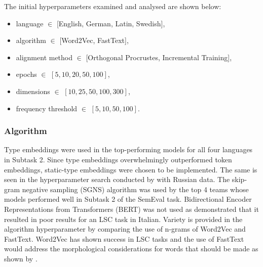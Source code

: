 The initial hyperparameters examined and analysed are shown below:
\begin{itemize}
    \item language $\in$ [English, German, Latin, Swedish],
    \item algorithm $\in$ [Word2Vec, FastText],
    \item alignment method $\in$ [Orthogonal Procrustes, Incremental Training],
    \item epochs $\in$ $[5, 10, 20, 50, 100]$,
    \item dimensions $\in$ $[10, 25, 50, 100, 300]$,
    \item frequency threshold $\in$ $[5, 10, 50, 100]$.
\end{itemize}%

\subsubsection{Algorithm}
Type embeddings were used in the top-performing models for all four languages in Subtask 2.  Since type embeddings overwhelmingly outperformed token embeddings, static-type embeddings were chosen to be implemented. The same is seen in the hyperparameter search conducted by \citet{hengchen2021SBXrushifteval} with Russian data. The skip-gram negative sampling (SGNS) algorithm was used by the top 4 teams whose models performed well in Subtask 2 of the SemEval task. Bidirectional Encoder Representations from Transformers (BERT) was not used as \citet{laicher-2020} demonstrated that it resulted in poor results for an LSC task in Italian. Variety is provided in the algorithm hyperparameter by comparing the use of n-grams of Word2Vec and FastText. Word2Vec has shown success in LSC tasks and the use of FastText would address the morphological considerations for words that should be made as shown by \citet{bojanowski2017enriching}.

